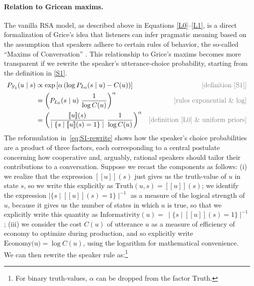 \documentclass{sp}
\newcommand{\sem}[1]{\ensuremath{[\![#1]\!]}}
\begin{document}
\paragraph{Relation to Gricean maxims.} The vanilla RSA model, as described above in Equations
\eqref{L0}--\eqref{L1}, is a direct formalization of Grice's idea that listeners can infer
pragmatic meaning based on the assumption that speakers adhere to certain rules of behavior,
the so-called ``Maxims of Conversation'' \citep{Grice1975:Logic-and-Conve}. This relationship to Grice's maxims becomes more
transparent if we rewrite the speaker's utterance-choice probability, starting from the
definition in \eqref{S1}.
%
\begin{align} \label{eq:S1-rewrite}
  P_{S_1}(u\mid s) & \propto \exp \left [ \alpha \left (\log P_{L_0}(s \mid u) - C(u) \right)  \right ] & \text{\textcolor{gray}{[definition \eqref{S1}]}} \\
  & = \left (P_{L_0}(s \mid u) \  \frac{1}{\log C(u)} \right)^{\alpha} & \text{\textcolor{gray}{[rules exponential \& log]}} \nonumber \\
  & = \left ( \frac{\sem{u}(s)}{\mid  \{s \mid \sem{u}(s)=1\} \mid } \ \frac{1}{\log C(u)} \right )^{\alpha} & \text{\textcolor{gray}{[definition \eqref{L0} \& uniform priors]}} \nonumber
\end{align}
%
The reformulation in~\eqref{eq:S1-rewrite} shows how the speaker's choice probabilities are a
product of three factors, each corresponding to a central postulate concerning how cooperative and, arguably, rational speakers should tailor their contributions
to a conversation. Suppose we recast the components as follows: (i) we realize that the expression $\sem{u}(s)$ just gives us the truth-value of $u$ in state $s$, so we write this explicitly as 
$\text{Truth}(u,s) = \sem{u}(s)$; we identify the expression $\mid \{s \mid \sem{u}(s)=1\} \mid ^{-1}$ as a measure of the logical strength of $u$, because it gives us the number of states in which $u$ is true, so that we explicitly write this quantity as  $\text{Informativity}(u) =\  \mid \{s \mid \sem{u}(s)=1\} \mid ^{-1}$; (iii) we consider the cost $C(u)$ of utterance $u$ as a measure of efficiency of economy to optimize during production, and so explicitly write $\text{Economy(u)} = \log C(u)$, using the logarithm for mathematical convenience. We can then rewrite the speaker rule as:\footnote{For
binary truth-values, $\alpha$ can be dropped from the factor $\text{Truth}$.}
\end{document}
